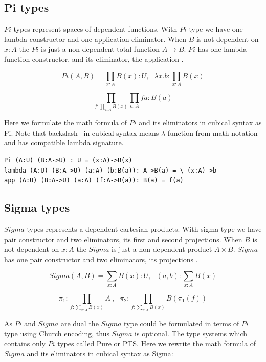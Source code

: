 \documentclass{svproc}
\begin{document}
\subsection{Pi types}

$Pi$ types represent spaces of dependent functions.
With $Pi$ type we have one lambda constructor
and one application eliminator. When $B$ is not dependent on $x:A$
the $Pi$ is just a non-dependent total function $A \rightarrow B$.
$Pi$ has one lambda function constructor, and its eliminator, the
application \cite{HoTT, Lof72, Lof84, Hofmann96, Mortberg17, Ulf09}.

$$Pi(A,B) = \prod_{x:A} B(x) : U,\ \ \ 
  \lambda x . b : \prod_{x:A} B(x)$$

$$\prod_{f:\prod_{x:A}B(x)}\prod_{a:A} f a : B (a)$$

Here we formulate the math formula of $Pi$ and its eliminators in cubical syntax as Pi.
Note that backslash \ in cubical syntax means $\lambda$ function from math notation
and has compatible lambda signature.

\begin{lstlisting}[mathescape=true]
Pi (A:U) (B:A->U) : U = (x:A)->B(x)
lambda (A:U) (B:A->U) (a:A) (b:B(a)): A->B(a) = \ (x:A)->b
app (A:U) (B:A->U) (a:A) (f:A->B(a)): B(a) = f(a)
\end{lstlisting}

\subsection{Sigma types}

$Sigma$ types represents a dependent cartesian products.
With sigma type we have pair constructor and two eliminators,
its first and second projections. When $B$ is not dependent on $x:A$
the $Sigma$ is just a non-dependent product $A \times B$.
$Sigma$ has one pair constructor and two eliminators, its projections
\cite{HoTT, Lof72, Lof84, Hofmann96, Mortberg17, Ulf09}.

$$Sigma(A,B) = \sum_{x:A} B(x) : U,\ \ \ 
  (a,b) : \sum_{x:A} B(x)$$

$$\pi_1 : \prod_{f:\sum_{x:A}B(x)}A\ ,\ \ \ \pi_2 : \prod_{f:\sum_{x:A}B(x)}B(\pi_1(f))$$

As $Pi$ and $Sigma$ are dual the $Sigma$ type could be formulated
in terms of $Pi$ type using Church encoding, thus $Sigma$ is optional.
The type systems which contains only $Pi$ types called Pure or PTS.
Here we rewrite the math formula of $Sigma$ and its eliminators in cubical syntax as Sigma:
\end{document}
